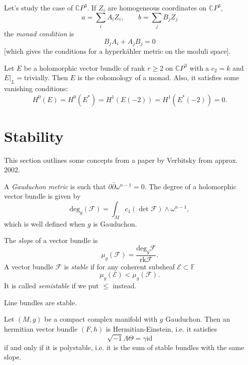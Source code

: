 \medskip\noindent
Let's study the case of $\mathbb{C}P^3$.
If $Z_i$ are homogeneous coordinates on
$\mathbb{C}P^3$,
$$
a=\sum_i A_iZ_i,\qquad b=\sum_jB_jZ_j
$$
the {\it monad condition} is
$$
B_jA_i+A_jB_j=0
$$
[which gives the conditions for a hyperkähler
metric on the moduli space].

\begin{theorem}
\label{theorem-bbh}
Let $E$ be a holomorphic vector bundle of
rank $r \geq 2$
on $\mathbb{C}P^3$ with a $c_2=k$ and
$E|_L=$trivially.
Then $E$ is the cohomology of a monad.
Also, it satisfies some vanishing conditions:
$$
H^0(E)=H^0(E^*)=H^1(E(-2))=H^1(E^*(-2))=0.
$$
\end{theorem}






\section{Stability}
\label{section-stability}

\noindent
This section outlines some concepts
from a paper by Verbitsky from approx. 2002.

A {\it Gauduchon metric} is such that
$\partial\bar\partial \omega^{n-1}=0$. The
degree of a holomorphic vector bundle is
given by $$ \text{deg}_g(\mathcal{F}) =
\int_M c_1(\det \mathcal{F}) \wedge
\omega^{n-1}, $$ which is well defined when
$g$ is Gauduchon.

\begin{definition}
\label{definition-slope-and-semistability}
The {\it slope} of a vector bundle is
$$
\mu_g(\mathcal{F}) = \frac{\text{deg}_g
\mathcal{F}}{\text{rk}\mathcal{F}}.
$$
A vector bundle $\mathcal{F}$ is {\it stable}
if for any coherent subsheaf $\mathcal{E}
\subset \mathbb{F}$
$$
\mu_g(\mathcal{E}) < \mu_g(\mathcal{F}).
$$
It is called {\it semistable} if we put $\le
$
instead.
\end{definition}

\begin{example}
\label{example-line-bundles-are-stable}
Line bundles are stable.
\end{example}

\begin{theorem}
\label{theorem-hitchin-kobayashi}
Let $(M,g)$ be a compact complex manifold
with $g$ Gauduchon.
Then an hermitian vector bundle $(F,h)$
is Hermitian-Einstein,
i.e. it satisfies
$$
\sqrt{-1}\Lambda\Theta=\gamma\text{id}
$$
if and only if
it is polystable, i.e.
it is the sum of stable bundles
with the same slope.
\end{theorem}

